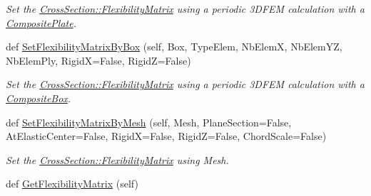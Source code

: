 \begin{DoxyCompactItemize}
\begin{DoxyCompactList}\small\item\em Set the \hyperlink{classgebtaero_1_1_cross_section_1_1_cross_section_ac20eafaf38ff757f9a8c9ae89212396a}{Cross\+Section\+::\+Flexibility\+Matrix} using a periodic 3\+D\+F\+EM calculation with a \hyperlink{namespacegebtaero_1_1_composite_plate}{Composite\+Plate}. \end{DoxyCompactList}\item 
def \hyperlink{classgebtaero_1_1_cross_section_1_1_cross_section_ac316b6aa8955415debcc2f5dd6e28db6}{Set\+Flexibility\+Matrix\+By\+Box} (self, Box, Type\+Elem, Nb\+ElemX, Nb\+Elem\+YZ, Nb\+Elem\+Ply, RigidX=False, RigidZ=False)
\begin{DoxyCompactList}\small\item\em Set the \hyperlink{classgebtaero_1_1_cross_section_1_1_cross_section_ac20eafaf38ff757f9a8c9ae89212396a}{Cross\+Section\+::\+Flexibility\+Matrix} using a periodic 3\+D\+F\+EM calculation with a \hyperlink{namespacegebtaero_1_1_composite_box}{Composite\+Box}. \end{DoxyCompactList}\item 
def \hyperlink{classgebtaero_1_1_cross_section_1_1_cross_section_a70eb1851ddf4a3f88fb14cfc827e0c83}{Set\+Flexibility\+Matrix\+By\+Mesh} (self, Mesh, Plane\+Section=False, At\+Elastic\+Center=False, RigidX=False, RigidZ=False, Chord\+Scale=False)
\begin{DoxyCompactList}\small\item\em Set the \hyperlink{classgebtaero_1_1_cross_section_1_1_cross_section_ac20eafaf38ff757f9a8c9ae89212396a}{Cross\+Section\+::\+Flexibility\+Matrix} using Mesh. \end{DoxyCompactList}\item 
def \hyperlink{classgebtaero_1_1_cross_section_1_1_cross_section_ac06cec90003112b1de53b100c0085842}{Get\+Flexibility\+Matrix} (self)
\end{DoxyCompactItemize}
